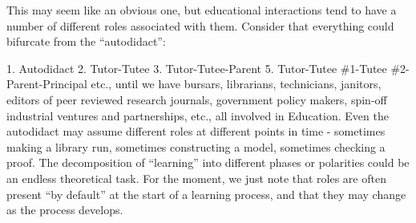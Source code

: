 This may seem like an obvious one, but educational interactions tend to
have a number of different roles associated with them. Consider that
everything could bifurcate from the ``autodidact'':

1. Autodidact 2. Tutor-Tutee 3. Tutor-Tutee-Parent 5. Tutor-Tutee
\#1-Tutee \#2-Parent-Principal etc., until we have bursars, librarians,
technicians, janitors, editors of peer reviewed research journals,
government policy makers, spin-off industrial ventures and partnerships,
etc., all involved in Education. Even the autodidact may assume
different roles at different points in time - sometimes making a library
run, sometimes constructing a model, sometimes checking a proof. The
decomposition of ``learning'' into different phases or polarities could
be an endless theoretical task. For the moment, we just note that roles
are often present ``by default'' at the start of a learning process, and
that they may change as the process develops.
